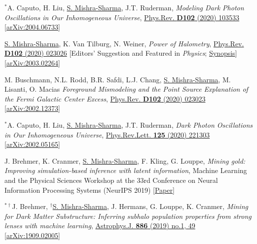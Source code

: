 \documentclass[letterpaper,11pt]{article}
\newenvironment{packed_enumerate}[1][]{
\begin{etaremune}[#1]
  \setlength{\itemsep}{3.7pt}
  \setlength{\parskip}{0pt}
  \setlength{\parsep}{0pt}}{\end{etaremune}
}
\begin{document}
\begin{packed_enumerate}[start=37]
  \item $^*$A. Caputo, H. Liu, \underline{S. Mishra-Sharma}, J.T. Ruderman, \emph{Modeling Dark Photon Oscillations in Our Inhomogeneous Universe}, \href{https://journals.aps.org/prd/abstract/10.1103/PhysRevD.102.103533}{Phys.Rev. \textbf{D102} (2020) 103533}   \href{https://arxiv.org/abs/2004.06733}{[arXiv:2004.06733]}

  \item \underline{S. Mishra-Sharma}, K. Van Tilburg, N. Weiner, \emph{Power of Halometry}, \href{https://journals.aps.org/prd/abstract/10.1103/PhysRevD.102.023026}{Phys.Rev. \textbf{D102} (2020) 023026} [Editors' Suggestion and Featured in \emph{Physics}; \href{https://physics.aps.org/articles/v13/s98}{Synopsis}]  \href{https://arxiv.org/abs/2003.02264}{[arXiv:2003.02264]}

  \item M. Buschmann, N.L. Rodd, B.R. Safdi, L.J. Chang, \underline{S. Mishra-Sharma}, M. Lisanti, O. Macias \emph{Foreground Mismodeling and the Point Source Explanation of the Fermi Galactic Center Excess},  \href{https://journals.aps.org/prd/abstract/10.1103/PhysRevD.102.023023}{Phys.Rev. \textbf{D102} (2020) 023023} \href{https://arxiv.org/abs/2002.12373}{[arXiv:2002.12373]} 

  \item $^*$A. Caputo, H. Liu, \underline{S. Mishra-Sharma}, J.T. Ruderman, \emph{Dark Photon Oscillations in Our Inhomogeneous Universe}, \href{https://journals.aps.org/prl/abstract/10.1103/PhysRevLett.125.221303}{Phys.Rev.Lett. \textbf{125} (2020) 221303}  \href{https://arxiv.org/abs/2002.05165}{[arXiv:2002.05165]}

  \item J. Brehmer, K. Cranmer, \underline{S. Mishra-Sharma}, F. Kling, G. Louppe, \emph{Mining gold: Improving simulation-based inference with latent information}, {Machine Learning and the Physical Sciences Workshop at the 33rd Conference on Neural Information Processing Systems (NeurIPS 2019)} \href{https://ml4physicalsciences.github.io/files/NeurIPS_ML4PS_2019_16.pdf}{[Paper]}

  \item $^{*\dagger}$J. Brehmer, $^\dagger$\underline{S. Mishra-Sharma}, J. Hermans, G. Louppe, K. Cranmer, \emph{Mining for Dark Matter Substructure: Inferring subhalo population properties from strong lenses with machine learning}, \href{https://iopscience.iop.org/article/10.3847/1538-4357/ab4c41}{Astrophys.J. \textbf{886} (2019) no.1, 49} \href{https://arxiv.org/abs/1909.02005}{[arXiv:1909.02005]}


\end{packed_enumerate}
\end{document}
